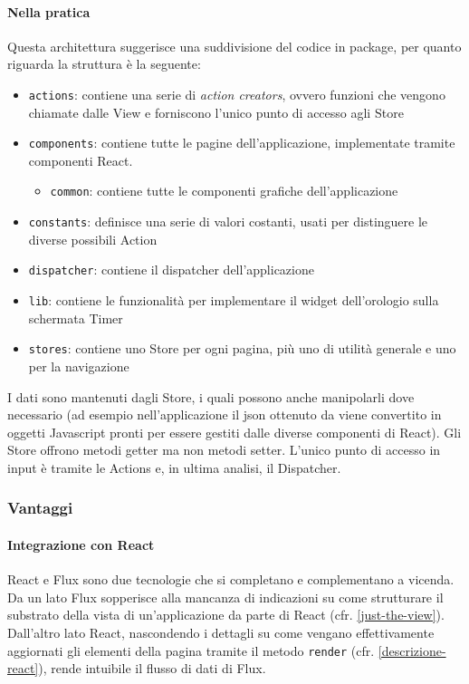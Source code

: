 \paragraph{Nella pratica}
Questa architettura suggerisce una suddivisione del codice in package, per quanto riguarda
\fiscoloMobile{} la struttura è la seguente:

\begin{itemize}
\item \texttt{actions}: contiene una serie di \textit{action creators}, ovvero funzioni
che vengono chiamate dalle View e forniscono l'unico punto di accesso agli Store
\item \texttt{components}: contiene tutte le pagine dell'applicazione, implementate tramite
componenti React.
	\begin{itemize}
	\item \texttt{common}: contiene tutte le componenti grafiche dell'applicazione
	\end{itemize}
\item \texttt{constants}: definisce una serie di valori costanti, usati per distinguere
le diverse possibili Action
\item \texttt{dispatcher}: contiene il dispatcher dell'applicazione
\item \texttt{lib}: contiene le funzionalità per implementare il widget dell'orologio sulla schermata Timer
\item \texttt{stores}: contiene uno Store per ogni pagina, più uno di utilità generale e uno
per la navigazione
\end{itemize}

I dati sono mantenuti dagli Store, i quali possono anche manipolarli dove necessario (ad
esempio nell'applicazione il json ottenuto da \fiscoloWeb{} viene convertito in oggetti
Javascript pronti per essere gestiti dalle diverse componenti di React). Gli Store offrono
metodi getter ma non metodi setter. L'unico punto di accesso in input è tramite le Actions
e, in ultima analisi, il Dispatcher.

\subsubsection{Vantaggi}

\paragraph{Integrazione con React}
React e Flux sono due tecnologie che si completano e complementano a vicenda. Da un lato
Flux sopperisce alla mancanza di indicazioni su come strutturare il substrato della vista
di un'applicazione da parte di React (cfr. \ref{just-the-view}). Dall'altro lato React,
nascondendo i dettagli su come vengano effettivamente aggiornati gli elementi della pagina
tramite il metodo \texttt{render} (cfr. \ref{descrizione-react}), rende intuibile il flusso
di dati di Flux.

